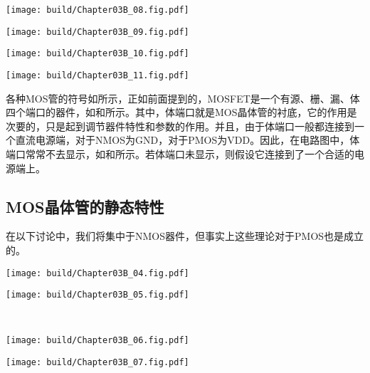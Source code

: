 \begin{Figure}[MOS晶体管的符号]
    \begin{FigureSub}[三端NMOS]
        \hspace{0.5cm}
        \texttt{[image: build/Chapter03B\_08.fig.pdf]}
        \hspace{0.5cm}
    \end{FigureSub}
    \begin{FigureSub}[三端PMOS]
        \hspace{0.5cm}
        \texttt{[image: build/Chapter03B\_09.fig.pdf]}
        \hspace{0.5cm}
    \end{FigureSub}
    \begin{FigureSub}[四端NMOS]
        \hspace{0.5cm}
        \texttt{[image: build/Chapter03B\_10.fig.pdf]}
        \hspace{0.5cm}
    \end{FigureSub}
    \begin{FigureSub}[四端PMOS]
        \hspace{0.5cm}
        \texttt{[image: build/Chapter03B\_11.fig.pdf]}
        \hspace{0.5cm}
    \end{FigureSub}
\end{Figure}

各种MOS管的符号如所示，正如前面提到的，MOSFET是一个有源、栅、漏、体四个端口的器件，如和所示。其中，体端口就是MOS晶体管的衬底，它的作用是次要的，只是起到调节器件特性和参数的作用。并且，由于体端口一般都连接到一个直流电源端，对于NMOS为GND，对于PMOS为VDD。因此，在电路图中，体端口常常不去显示，如和所示。若体端口未显示，则假设它连接到了一个合适的电源端上。

\subsection{MOS晶体管的静态特性}
在以下讨论中，我们将集中于NMOS器件，但事实上这些理论对于PMOS也是成立的。

\begin{Figure}[MOS管的工作状态]
    \begin{FigureSub}[初始状态]
        \texttt{[image: build/Chapter03B\_04.fig.pdf]}
    \end{FigureSub}
    \hspace{0.9cm}
    \begin{FigureSub}[栅耗尽层]
        \texttt{[image: build/Chapter03B\_05.fig.pdf]}
    \end{FigureSub}\\ \vspace{0.8cm}
    \begin{FigureSub}[沟道形成]
        \texttt{[image: build/Chapter03B\_06.fig.pdf]}
    \end{FigureSub}
    \hspace{0.9cm}
    \begin{FigureSub}[沟道夹断]
        \texttt{[image: build/Chapter03B\_07.fig.pdf]}
    \end{FigureSub}
\end{Figure}

